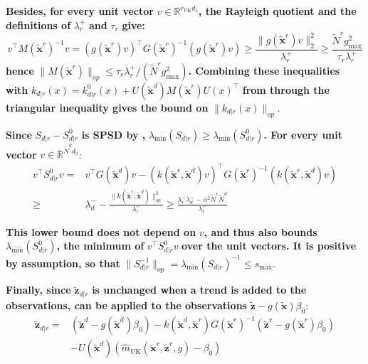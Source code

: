 \documentclass[preprint]{elsarticle}
\begin{document}
\textbf{Besides, for every unit vector} $v\in\mathbb{R}^{r_{\mathrm{UK}}d_z}$\textbf{, the Rayleigh quotient \cite{bib:matrix-analysis} and the definitions of} $\lambda_r^+$ \textbf{and} $\tau_r$ \textbf{give:}
\begin{equation*}
    v^\top M(\tilde{\mathbf{x}}^r)^{-1}v=\left(g(\tilde{\mathbf{x}}^r)v\right)^\top G(\tilde{\mathbf{x}}^r)^{-1}\left(g(\tilde{\mathbf{x}}^r)v\right)\geq\frac{\|g(\tilde{\mathbf{x}}^r)v\|_2^2}{\lambda_r^+}\geq\frac{\tilde{N}^rg_{\max}^2}{\tau_r\lambda_r^+}
\end{equation*}
\textbf{hence} $\|M(\tilde{\mathbf{x}}^r)\|_{op}\leq\tau_r\lambda_r^+/(\tilde{N}^rg_{\max}^2)$\textbf{. Combining these inequalities with} $k_{d|r}(x)=k^0_{d|r}(x)+U(\tilde{\mathbf{x}}^d)M(\tilde{\mathbf{x}}^r)U(x)^\top$ \textbf{from  through the triangular inequality gives the bound on} $\|k_{d|r}(x)\|_{op}$.

\textbf{Since} $S_{d|r}-S^0_{d|r}$ \textbf{is SPSD by ,} $\lambda_{\min}(S_{d|r})\geq\lambda_{\min}(S^0_{d|r})$\textbf{. For every unit vector} $v\in\mathbb{R}^{\tilde{N}^dd_z}$:
\begin{equation*}
    \begin{aligned}
    v^\top S^0_{d|r}v=&v^\top G(\tilde{\mathbf{x}}^d)v-\left(k(\tilde{\mathbf{x}}^r,\tilde{\mathbf{x}}^d)v\right)^\top G(\tilde{\mathbf{x}}^r)^{-1}\left(k(\tilde{\mathbf{x}}^r,\tilde{\mathbf{x}}^d)v\right)\\
    \geq&\lambda_d^--\frac{\|k(\tilde{\mathbf{x}}^r,\tilde{\mathbf{x}}^d)\|_{op}^2}{\lambda_r^-}\geq\frac{\lambda_r^-\lambda_d^--\alpha^2\tilde{N}^r\tilde{N}^d}{\lambda_r^-}
    \end{aligned}
\end{equation*}

\textbf{This lower bound does not depend on} $v$\textbf{, and thus also bounds} $\lambda_{\min}(S^0_{d|r})$\textbf{, the minimum of} $v^\top S^0_{d|r}v$ \textbf{over the unit vectors. It is positive by assumption, so that} $\|S_{d|r}^{-1}\|_{op}=\lambda_{\min}(S_{d|r})^{-1}\leq s_{\max}$.

\textbf{Finally, since} $\tilde{\mathbf{z}}_{d|r}$ \textbf{is unchanged when a trend is added to the observations,  can be applied to the observations} $\tilde{\mathbf{z}}-g(\tilde{\mathbf{x}})\beta_0$:
\begin{equation*}
    \begin{aligned}
    \tilde{\mathbf{z}}_{d|r}=&\left(\tilde{\mathbf{z}}^d-g(\tilde{\mathbf{x}}^d)\beta_0\right)-k(\tilde{\mathbf{x}}^d,\tilde{\mathbf{x}}^r)G(\tilde{\mathbf{x}}^r)^{-1}\left(\tilde{\mathbf{z}}^r-g(\tilde{\mathbf{x}}^r)\beta_0\right)\\
    &-U(\tilde{\mathbf{x}}^d)\left(\hat{m}_{\mathrm{UK}}(\tilde{\mathbf{x}}^r,\tilde{\mathbf{z}}^r,g)-\beta_0\right)
    \end{aligned}
\end{equation*}
\end{document}
